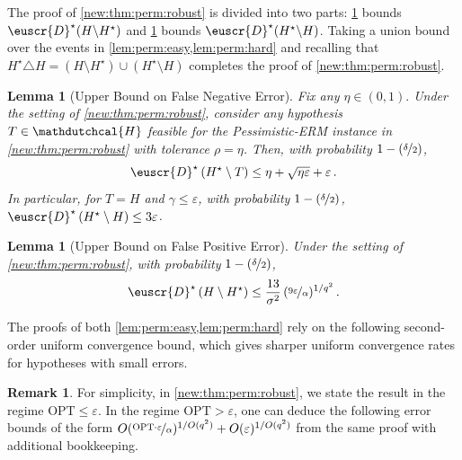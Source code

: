 \documentclass[11pt]{article}
\theoremstyle{plain}
\newtheorem{lemma}[theorem]{Lemma}
\theoremstyle{definition}
\newtheorem{remark}[theorem]{Remark}
\theoremstyle{remark}
\newcommand{\inparen}[1]{\left(#1\right)}
\newcommand{\nfrac}[2]{\nicefrac{#1}{#2}}
\newcommand{\opt}{\ensuremath{\mathrm{OPT}}}
\newcommand{\eps}{\varepsilon}
\newcommand{\customcal}[1]{\euscr{#1}}
\newcommand{\cD}{\customcal{D}}
\newcommand{\hypo}[1]{\mathdutchcal{#1}}
\newcommand{\hyH}{\hypo{H}}
\newcommand{\pERM}{Pessimistic-ERM}
\newcommand{\optset}{{H^\star}}
\newcommand{\cDtrue}{\cD^\star}
\begin{document}
    
    \begin{figure}[omitted: a diagram of this paper's results, not reproduced here]\label{fig:outline:sampleComplexity}\end{figure}
    
    \noindent The proof of \cref{new:thm:perm:robust} is divided into two parts: \cref{lem:perm:easy} bounds $\cDtrue(H \backslash H^\star)$ and \cref{lem:perm:hard} bounds $\cDtrue(H^\star \backslash H)$.
        Taking a union bound over the events in \cref{lem:perm:easy,lem:perm:hard} and recalling that $\optset\triangle H=\inparen{H\setminus \optset}\cup \inparen{\optset\setminus H}$ completes the proof of \cref{new:thm:perm:robust}.
        \begin{lemma}[Upper Bound on False Negative Error]\label{lem:perm:easy} 
            Fix any $\eta\in (0,1).$
            Under the setting of \cref{new:thm:perm:robust}, consider any hypothesis $T\in \hyH$ feasible for the \pERM{} instance in \cref{new:thm:perm:robust} with tolerance $\rho=\eta$.
            Then, with probability $1-\inparen{\nfrac{\delta}{2}}$,
            \[
                \cDtrue\inparen{\optset\setminus T} \leq \eta+\sqrt{\eta\eps}+\eps\,.
            \]
            In particular, for $T=H$ and $\gamma\leq \eps$, with probability $1-\inparen{\nfrac{\delta}{2}}$, $\cDtrue\inparen{\optset \setminus H}\leq 3\eps$.
        \end{lemma}
        \begin{lemma}[Upper Bound on False Positive Error]\label{lem:perm:hard} 
            Under the setting of \cref{new:thm:perm:robust}, with probability $1-\inparen{\nfrac{\delta}{2}}$,  
            \[
                \cDtrue\inparen{H\setminus\optset} \leq 
                \frac{13}{\sigma^2} \, (\nfrac{9\eps}{\alpha})^{1/q^2}\,.
            \]
        \end{lemma}
        The proofs of both \cref{lem:perm:easy,lem:perm:hard} rely on the following second-order uniform convergence bound, which gives sharper uniform convergence rates for hypotheses with small errors.

        \begin{remark}
            For simplicity, in \cref{new:thm:perm:robust}, we state the result in the regime $\opt\leq\eps$. %
            In the regime $\opt > \eps$,  one can deduce the following error bounds of the form $O(\nfrac{\opt\cdot \eps}{\alpha})^{1/O(q^2)} + O(\eps)^{1/O(q^2)}$ from the same proof with additional bookkeeping.
        \end{remark}
        
\end{document}
